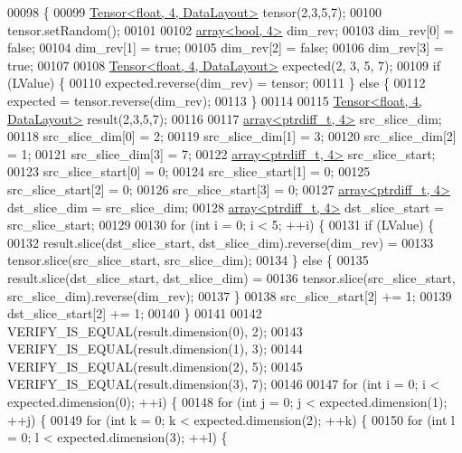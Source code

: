 \begin{DoxyCode}
00098 \{
00099   \hyperlink{class_eigen_1_1_tensor}{Tensor<float, 4, DataLayout>} tensor(2,3,5,7);
00100   tensor.setRandom();
00101 
00102   \hyperlink{class_eigen_1_1array}{array<bool, 4>} dim\_rev;
00103   dim\_rev[0] = \textcolor{keyword}{false};
00104   dim\_rev[1] = \textcolor{keyword}{true};
00105   dim\_rev[2] = \textcolor{keyword}{false};
00106   dim\_rev[3] = \textcolor{keyword}{true};
00107 
00108   \hyperlink{class_eigen_1_1_tensor}{Tensor<float, 4, DataLayout>} expected(2, 3, 5, 7);
00109   \textcolor{keywordflow}{if} (LValue) \{
00110     expected.reverse(dim\_rev) = tensor;
00111   \} \textcolor{keywordflow}{else} \{
00112     expected = tensor.reverse(dim\_rev);
00113   \}
00114 
00115   \hyperlink{class_eigen_1_1_tensor}{Tensor<float, 4, DataLayout>} result(2,3,5,7);
00116 
00117   \hyperlink{class_eigen_1_1array}{array<ptrdiff\_t, 4>} src\_slice\_dim;
00118   src\_slice\_dim[0] = 2;
00119   src\_slice\_dim[1] = 3;
00120   src\_slice\_dim[2] = 1;
00121   src\_slice\_dim[3] = 7;
00122   \hyperlink{class_eigen_1_1array}{array<ptrdiff\_t, 4>} src\_slice\_start;
00123   src\_slice\_start[0] = 0;
00124   src\_slice\_start[1] = 0;
00125   src\_slice\_start[2] = 0;
00126   src\_slice\_start[3] = 0;
00127   \hyperlink{class_eigen_1_1array}{array<ptrdiff\_t, 4>} dst\_slice\_dim = src\_slice\_dim;
00128   \hyperlink{class_eigen_1_1array}{array<ptrdiff\_t, 4>} dst\_slice\_start = src\_slice\_start;
00129 
00130   \textcolor{keywordflow}{for} (\textcolor{keywordtype}{int} i = 0; i < 5; ++i) \{
00131     \textcolor{keywordflow}{if} (LValue) \{
00132       result.slice(dst\_slice\_start, dst\_slice\_dim).reverse(dim\_rev) =
00133           tensor.slice(src\_slice\_start, src\_slice\_dim);
00134     \} \textcolor{keywordflow}{else} \{
00135       result.slice(dst\_slice\_start, dst\_slice\_dim) =
00136           tensor.slice(src\_slice\_start, src\_slice\_dim).reverse(dim\_rev);
00137     \}
00138     src\_slice\_start[2] += 1;
00139     dst\_slice\_start[2] += 1;
00140   \}
00141 
00142   VERIFY\_IS\_EQUAL(result.dimension(0), 2);
00143   VERIFY\_IS\_EQUAL(result.dimension(1), 3);
00144   VERIFY\_IS\_EQUAL(result.dimension(2), 5);
00145   VERIFY\_IS\_EQUAL(result.dimension(3), 7);
00146 
00147   \textcolor{keywordflow}{for} (\textcolor{keywordtype}{int} i = 0; i < expected.dimension(0); ++i) \{
00148     \textcolor{keywordflow}{for} (\textcolor{keywordtype}{int} j = 0; j < expected.dimension(1); ++j) \{
00149       \textcolor{keywordflow}{for} (\textcolor{keywordtype}{int} k = 0; k < expected.dimension(2); ++k) \{
00150         \textcolor{keywordflow}{for} (\textcolor{keywordtype}{int} l = 0; l < expected.dimension(3); ++l) \{

\end{DoxyCode}
